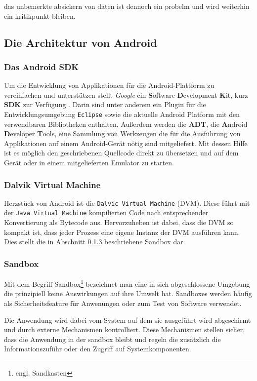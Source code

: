 das unbemerkte absickern von daten ist dennoch ein probelm und wird weiterhin ein kritikpunkt bleiben.


\subsection{Die Architektur von Android}

\subsubsection{Das Android SDK}

Um die Entwicklung von Applikationen für die Android-Plattform zu vereinfachen und unterstützen stellt \emph{Google} ein \textbf{S}oftware \textbf{D}evelopment \textbf{K}it, kurz \textbf{SDK} zur Verfügung \cite{android_sdk}. Darin sind unter anderem ein Plugin für die Entwicklungsumgebung \verb+Eclipse+ sowie die aktuelle Android Platform mit den verwendbaren Bibliotheken enthalten. Außerdem werden die \textbf{ADT}, die \textbf{A}ndroid \textbf{D}eveloper \textbf{T}ools, eine Sammlung von Werkzeugen die für die Ausführung von Applikationen auf einem Android-Gerät nötig sind mitgeliefert. Mit dessen Hilfe ist es möglich den geschriebenen Quellcode direkt zu übersetzen und auf dem Gerät oder in einem mitgelieferten Emulator zu starten.

\subsubsection{Dalvik Virtual Machine}
Herzstück von Android ist die \verb+Dalvic Virtual Machine+ (DVM). Diese führt mit der \verb+Java Virtual Machine+ kompilierten Code nach entsprechender Konvertierung als Bytecode aus. Hervorzuheben ist dabei, dass die DVM so kompakt ist, dass jeder Prozess eine eigene Instanz der DVM ausführen kann. Dies stellt die in Abschnitt \ref{sandbox} beschriebene Sandbox dar. 

\subsubsection{Sandbox}
\label{sandbox}
Mit dem Begriff Sandbox\footnote{engl. Sandkasten} bezeichnet man eine in sich abgeschlossene Umgebung die prinzipiell keine Auswirkungen auf ihre Umwelt hat. Sandboxes werden häufig als Sicherheitsfeature für Anwenungen oder zum Test von Software verwendet.

Die Anwendung wird dabei vom System auf dem sie ausgeführt wird abgeschirmt und durch externe Mechanismen kontrolliert. Diese Mechanismen stellen sicher, dass die Anwendung in der sandbox bleibt und regeln die zusätzlich die Informationszuführ oder den Zugriff auf Systemkomponenten.

